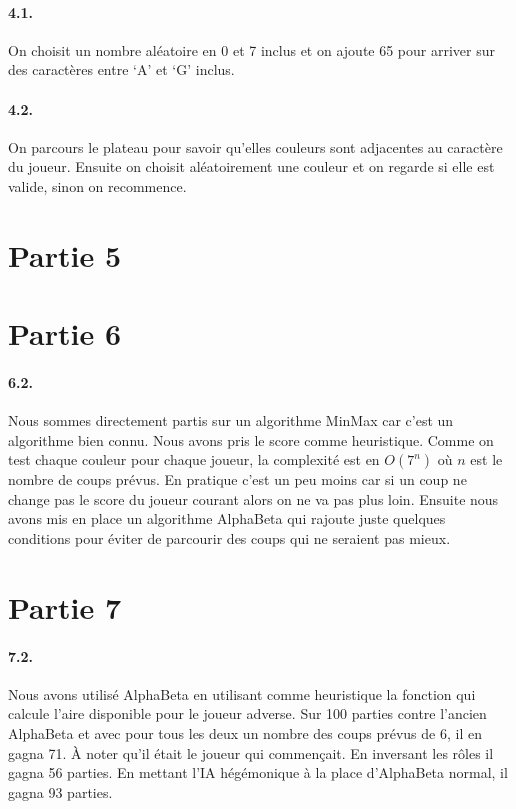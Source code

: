 \documentclass[a4paper]{article}
\begin{document}
    \paragraph{4.1.} On choisit un nombre aléatoire en 0 et 7 inclus et on
    ajoute 65 pour arriver sur des caractères entre `A' et `G' inclus.

    \paragraph{4.2.} On parcours le plateau pour savoir qu'elles couleurs sont
    adjacentes au caractère du joueur. Ensuite on choisit aléatoirement une
    couleur et on regarde si elle est valide, sinon on recommence.

    \section{Partie 5}

    \section{Partie 6}
    \paragraph{6.2.} Nous sommes directement partis sur un algorithme MinMax
    car c'est un algorithme bien connu. Nous avons pris le score comme
    heuristique. Comme on test chaque couleur pour chaque joueur, la complexité
    est en $O(7^n)$ où $n$ est le nombre de coups prévus. En pratique c'est un
    peu moins car si un coup ne change pas le score du joueur courant alors on
    ne va pas plus loin.  Ensuite nous avons mis en place un algorithme
    AlphaBeta qui rajoute juste quelques conditions pour éviter de parcourir
    des coups qui ne seraient pas mieux.

    \section{Partie 7}
    \paragraph{7.2.} Nous avons utilisé AlphaBeta en utilisant comme
    heuristique la fonction qui calcule l'aire disponible pour le joueur
    adverse. Sur 100 parties contre l'ancien AlphaBeta et avec pour tous les
    deux un nombre des coups prévus de 6, il en gagna 71. À noter qu'il était
    le joueur qui commençait. En inversant les rôles il gagna 56 parties.
    En mettant l'IA hégémonique à la place d'AlphaBeta normal, il gagna 93
    parties.
\end{document}
